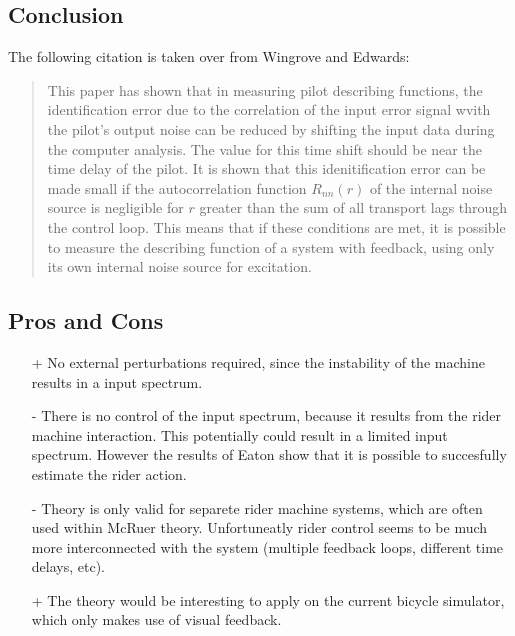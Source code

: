 \subsection{Conclusion}
The following citation is taken over from Wingrove and Edwards:
\begin{quote}
		This paper has shown that in measuring pilot describing
		functions, the identification error due to the correlation
		of the input error signal wvith the pilot's output noise can
		be reduced by shifting the input data during the computer
		analysis. The value for this time shift should be near the
		time delay of the pilot. It is shown that this idenitification
		error can be made small if the autocorrelation function
		$R_{nn}(r)$ of the internal noise source is negligible for $r$
		greater than the sum of all transport lags through the
		control loop. This means that if these conditions are met,
		it is possible to measure the describing function of a
		system with feedback, using only its own internal noise
		source for excitation.
\end{quote}
\subsection{Pros and Cons}
\begin{itemize}
		\item[+] No external perturbations required, since the instability of the machine results in a input spectrum. 
		\item[-] There is no control of the input spectrum, because it results from the rider machine interaction. This potentially could result in a limited input spectrum. However the results of Eaton show that it is possible to succesfully estimate the rider action.
		\item[-] Theory is only valid for separete rider machine systems, which are often used within McRuer theory. Unfortuneatly rider control seems to be much more interconnected with the system (multiple feedback loops, different time delays, etc).
		\item[+] The theory would be interesting to apply on the current bicycle simulator, which only makes use of visual feedback.
\end{itemize}
%
%
